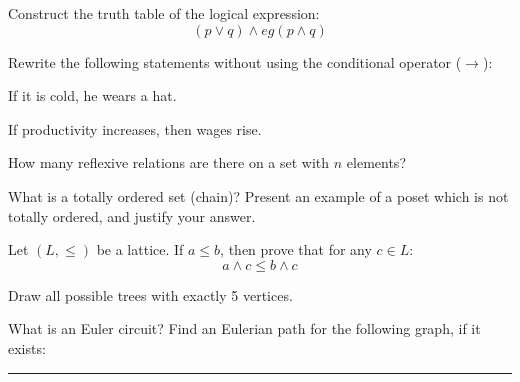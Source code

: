 \documentclass[11pt,a4paper]{article}
\begin{document}
\begin{parts}
  \item Construct the truth table of the logical expression:
  \[ (p \lor q) \land 
eg(p \land q) \]
  \item Rewrite the following statements without using the conditional operator ($\rightarrow$):
  
\begin{parts}
    \item If it is cold, he wears a hat.
    \item If productivity increases, then wages rise.
  \end{parts}
  \item How many reflexive relations are there on a set with $n$ elements?
  \item What is a totally ordered set (chain)? Present an example of a poset which is not totally ordered, and justify your answer.
  \item Let $(L, \le)$ be a lattice. If $a \le b$, then prove that for any $c \in L$:
  \[ a \land c \le b \land c \]
  \item Draw all possible trees with exactly 5 vertices.
  \item What is an Euler circuit? Find an Eulerian path for the following graph, if it exists:
  
\begin{center}
    
  \end{center}
\end{parts}

\medskip\rule{\linewidth}{0.2pt}
\end{document}
